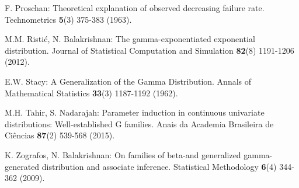\documentclass[12pt,a4paper]{article} %
\begin{document}
\begin{description}
\item
F. Proschan:
Theoretical explanation of observed decreasing failure rate.
Technometrics {\bf 5}(3) 375-383 (1963).

\item
M.M. Risti\'{c}, N. Balakrishnan:
The gamma-exponentiated exponential distribution.
Journal of Statistical Computation and Simulation {\bf 82}(8) 1191-1206 (2012).

\item
E.W. Stacy: A Generalization of the Gamma Distribution. Annals of Mathematical Statistics {\bf 33}(3) 1187-1192 (1962).

\item
M.H. Tahir, S. Nadarajah:
Parameter induction in continuous univariate distributions: Well-established G families.
Anais da Academia Brasileira de Ci\^{e}ncias {\bf 87}(2) 539-568 (2015).

\item
K. Zografos, N. Balakrishnan:
On families of beta-and generalized gamma-generated distribution and
associate inference.  Statistical Methodology {\bf 6}(4) 344-362 (2009).

\end{description}
\end{document}
